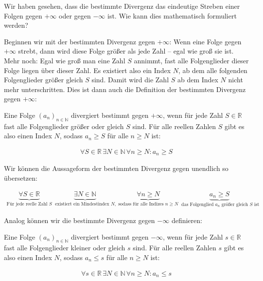 \documentclass[fontsize=9pt,
               parskip=half-,
               DIV=14,
               listof=chapterentry,
               tocflat]{scrbook}
\begin{document}
Wir haben gesehen, dass die bestimmte Divergenz das eindeutige Streben einer Folgen gegen $+\infty $ oder gegen $-\infty $ ist. Wie kann dies mathematisch formuliert werden?

Beginnen wir mit der bestimmten Divergenz gegen $+\infty $: Wenn eine Folge gegen $+\infty $ strebt, dann wird diese Folge größer als jede Zahl – egal wie groß sie ist. Mehr noch: Egal wie groß man eine Zahl $S$ annimmt, fast alle Folgenglieder dieser Folge liegen über dieser Zahl. Es existiert also ein Index $N$, ab dem alle folgenden Folgenglieder größer gleich $S$ sind. Damit wird die Zahl $S$ ab dem Index $N$ nicht mehr unterschritten. Dies ist dann auch die Definition der bestimmten Divergenz gegen $+\infty $:

\begin{definition*}
Eine Folge $(a_{n})_{n\in \mathbb {N} }$ divergiert bestimmt gegen $+\infty $, wenn für jede Zahl $S\in \mathbb {R} $ fast alle Folgenglieder größer oder gleich $S$ sind. Für alle reellen Zahlen $S$ gibt es also einen Index $N$, sodass $a_{n}\geq S$ für alle $n\geq N$ ist:

\begin{align*}
\forall S\in \mathbb {R} \,\exists N\in \mathbb {N} \,\forall n\geq N:a_{n}\geq S
\end{align*}

\end{definition*}

Wir können die Aussageform der bestimmten Divergenz gegen unendlich so übersetzen:

\begin{align*}
\underbrace {{\underset {}{}}\forall S\in \mathbb {R} } _{{\text{Für jede reelle Zahl }}S}\ \underbrace {{\underset {}{}}\exists N\in \mathbb {N} } _{{\text{ existiert ein Mindestindex }}N,}\ \underbrace {{\underset {}{}}\forall n\geq N} _{{\text{sodass für alle Indizes }}n\geq N}\ \underbrace {{\underset {}{}}a_{n}\geq S} _{{\text{ das Folgenglied }}a_{n}{\text{ größer gleich }}S{\text{ ist}}}
\end{align*}

Analog können wir die bestimmte Divergenz gegen $-\infty $ definieren:

\begin{definition*}
Eine Folge $(a_{n})_{n\in \mathbb {N} }$ divergiert bestimmt gegen $-\infty $, wenn für jede Zahl $s\in \mathbb {R} $ fast alle Folgenglieder kleiner oder gleich $s$ sind. Für alle reellen Zahlen $s$ gibt es also einen Index $N$, sodass $a_{n}\leq s$ für alle $n\geq N$ ist:

\begin{align*}
\forall s\in \mathbb {R} \,\exists N\in \mathbb {N} \,\forall n\geq N:a_{n}\leq s
\end{align*}

\end{definition*}
\end{document}
